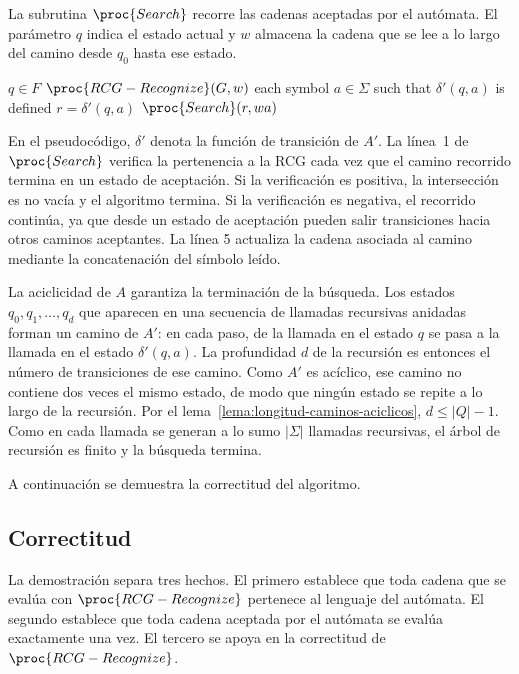 La subrutina $\proc{Search}$ recorre las cadenas aceptadas por el
autómata. El parámetro $q$ indica el estado actual y $w$ almacena la
cadena que se lee a lo largo del camino desde $q_0$ hasta ese estado.

\begin{codebox}
\li \If $q \in F$  $\proc{RCG-Recognize}(G,w)$
\li \Then \Return {}
    \End
\li \For each symbol $a \in \Sigma$ such that $\delta'(q,a)$ is defined
\li \Do
        $r = \delta'(q,a)$
\li     \If $\proc{Search}(r,wa)$
\li     \Then \Return {}
        \End
    \End
\li \Return {}
\end{codebox}

En el pseudocódigo, $\delta'$ denota la función de transición de $A'$.
La línea~1 de $\proc{Search}$ verifica la pertenencia a la RCG cada vez
que el camino recorrido termina en un estado de aceptación. Si la
verificación
es positiva, la intersección es no vacía y el algoritmo termina. Si la
verificación es negativa, el recorrido continúa, ya que desde un estado
de aceptación pueden salir transiciones hacia otros caminos aceptantes.
La línea
5 actualiza la cadena asociada al camino mediante la concatenación del
símbolo leído.

La aciclicidad de $A$ garantiza la terminación de la búsqueda. Los
estados $q_0,q_1,\ldots,q_d$ que aparecen en una secuencia de llamadas
recursivas anidadas forman un camino de $A'$: en cada paso, de la
llamada en el estado $q$ se pasa a la llamada en el estado
$\delta'(q,a)$. La profundidad $d$ de la recursión es entonces el número
de transiciones de ese camino. Como $A'$ es acíclico, ese camino no
contiene dos veces el mismo estado, de modo que ningún estado se repite
a lo largo de la recursión. Por el
lema~\ref{lema:longitud-caminos-aciclicos}, $d \le |Q|-1$. Como en cada
llamada se generan a lo sumo $|\Sigma|$ llamadas recursivas, el árbol de
recursión es finito y la búsqueda termina.

A continuación se demuestra la correctitud del algoritmo.

\subsection{Correctitud}
\label{sec:correctitud-algoritmo}

La demostración separa tres hechos. El primero establece
que toda cadena que se evalúa con $\proc{RCG-Recognize}$ pertenece al
lenguaje del autómata. El segundo establece que toda cadena aceptada por
el autómata se evalúa exactamente una vez. El tercero se apoya en la
correctitud de $\proc{RCG-Recognize}$.


